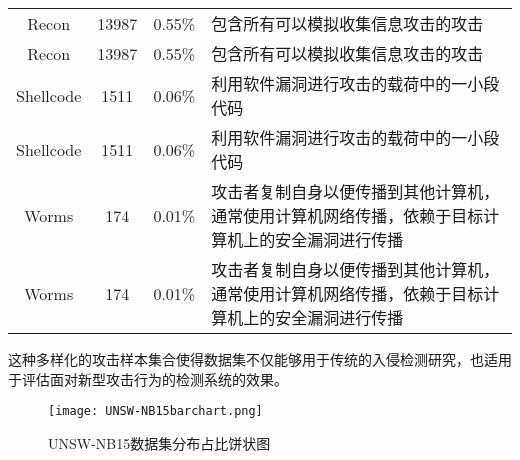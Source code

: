 \begin{table}[h]
\begin{tabularx}{\textwidth}{@{}cccX@{}}
		Recon                             & 13987                             & 0.55\%                                  & 包含所有可以模拟收集信息攻击的攻击                                                               \\
		Recon                             & 13987                             & 0.55\%                                  & 包含所有可以模拟收集信息攻击的攻击                                                               \\

		Shellcode                         & 1511                              & 0.06\%                                  & 利用软件漏洞进行攻击的载荷中的一小段代码                                                         \\
		Shellcode                         & 1511                              & 0.06\%                                  & 利用软件漏洞进行攻击的载荷中的一小段代码                                                         \\

		Worms                             & 174                               & 0.01\%                                  & 攻击者复制自身以便传播到其他计算机，通常使用计算机网络传播，依赖于目标计算机上的安全漏洞进行传播 \\
		Worms                             & 174                               & 0.01\%                                  & 攻击者复制自身以便传播到其他计算机，通常使用计算机网络传播，依赖于目标计算机上的安全漏洞进行传播 \\
		\bottomrule
	\end{tabularx}
\end{table}
这种多样化的攻击样本集合使得数据集不仅能够用于传统的入侵检测研究，也适用于评估面对新型攻击行为的检测系统的效果。
\begin{figure}[h]
	\centering
	\texttt{[image: UNSW-NB15barchart.png]}
	\caption{UNSW-NB15数据集分布占比饼状图}
	\label{fig:UNSW-NB15barchart}
\end{figure}

